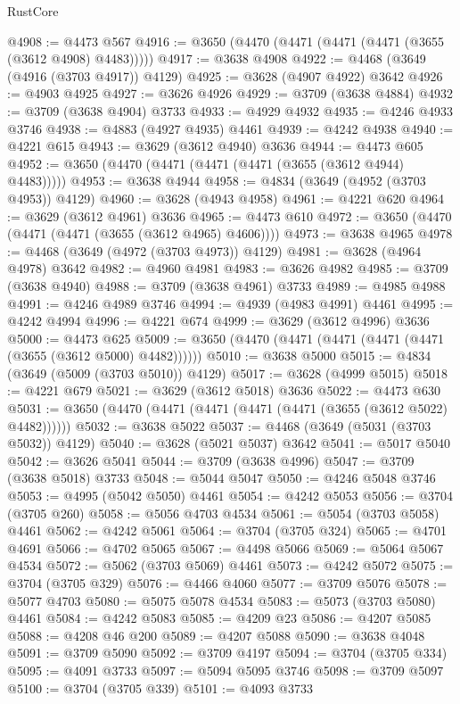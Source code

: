 \begin{lexlean}{RustCore}
\begin{coremodule}
@4908 := @4473 @567
@4916 := @3650 (@4470 (@4471 (@4471 (@4471 (@3655 (@3612 @4908) @4483)))))
@4917 := @3638 @4908
@4922 := @4468 (@3649 (@4916 (@3703 @4917)) @4129)
@4925 := @3628 (@4907 @4922) @3642
@4926 := @4903 @4925
@4927 := @3626 @4926
@4929 := @3709 (@3638 @4884)
@4932 := @3709 (@3638 @4904) @3733
@4933 := @4929 @4932
@4935 := @4246 @4933 @3746
@4938 := @4883 (@4927 @4935) @4461
@4939 := @4242 @4938
@4940 := @4221 @615
@4943 := @3629 (@3612 @4940) @3636
@4944 := @4473 @605
@4952 := @3650 (@4470 (@4471 (@4471 (@4471 (@3655 (@3612 @4944) @4483)))))
@4953 := @3638 @4944
@4958 := @4834 (@3649 (@4952 (@3703 @4953)) @4129)
@4960 := @3628 (@4943 @4958)
@4961 := @4221 @620
@4964 := @3629 (@3612 @4961) @3636
@4965 := @4473 @610
@4972 := @3650 (@4470 (@4471 (@4471 (@3655 (@3612 @4965) @4606))))
@4973 := @3638 @4965
@4978 := @4468 (@3649 (@4972 (@3703 @4973)) @4129)
@4981 := @3628 (@4964 @4978) @3642
@4982 := @4960 @4981
@4983 := @3626 @4982
@4985 := @3709 (@3638 @4940)
@4988 := @3709 (@3638 @4961) @3733
@4989 := @4985 @4988
@4991 := @4246 @4989 @3746
@4994 := @4939 (@4983 @4991) @4461
@4995 := @4242 @4994
@4996 := @4221 @674
@4999 := @3629 (@3612 @4996) @3636
@5000 := @4473 @625
@5009 := @3650 (@4470 (@4471 (@4471 (@4471 (@4471 (@3655 (@3612 @5000) @4482))))))
@5010 := @3638 @5000
@5015 := @4834 (@3649 (@5009 (@3703 @5010)) @4129)
@5017 := @3628 (@4999 @5015)
@5018 := @4221 @679
@5021 := @3629 (@3612 @5018) @3636
@5022 := @4473 @630
@5031 := @3650 (@4470 (@4471 (@4471 (@4471 (@4471 (@3655 (@3612 @5022) @4482))))))
@5032 := @3638 @5022
@5037 := @4468 (@3649 (@5031 (@3703 @5032)) @4129)
@5040 := @3628 (@5021 @5037) @3642
@5041 := @5017 @5040
@5042 := @3626 @5041
@5044 := @3709 (@3638 @4996)
@5047 := @3709 (@3638 @5018) @3733
@5048 := @5044 @5047
@5050 := @4246 @5048 @3746
@5053 := @4995 (@5042 @5050) @4461
@5054 := @4242 @5053
@5056 := @3704 (@3705 @260)
@5058 := @5056 @4703 @4534
@5061 := @5054 (@3703 @5058) @4461
@5062 := @4242 @5061
@5064 := @3704 (@3705 @324)
@5065 := @4701 @4691
@5066 := @4702 @5065
@5067 := @4498 @5066
@5069 := @5064 @5067 @4534
@5072 := @5062 (@3703 @5069) @4461
@5073 := @4242 @5072
@5075 := @3704 (@3705 @329)
@5076 := @4466 @4060
@5077 := @3709 @5076
@5078 := @5077 @4703
@5080 := @5075 @5078 @4534
@5083 := @5073 (@3703 @5080) @4461
@5084 := @4242 @5083
@5085 := @4209 @23
@5086 := @4207 @5085
@5088 := @4208 @46 @200
@5089 := @4207 @5088
@5090 := @3638 @4048
@5091 := @3709 @5090
@5092 := @3709 @4197
@5094 := @3704 (@3705 @334)
@5095 := @4091 @3733
@5097 := @5094 @5095 @3746
@5098 := @3709 @5097
@5100 := @3704 (@3705 @339)
@5101 := @4093 @3733

\end{coremodule}
\end{lexlean}
